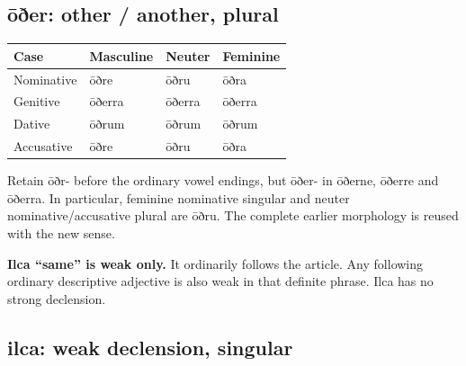 \subsection*{ōðer: other /\allowbreak{} another, plural}

\par\begingroup
\fontsize{10.5}{13.2}\selectfont
\setlength{\LTleft}{0pt}\setlength{\LTright}{\fill}
\noindent
\begin{tabular}{@{}>{\raggedright\arraybackslash}p{28.89mm}>{\raggedright\arraybackslash}p{28.89mm}>{\raggedright\arraybackslash}p{28.89mm}>{\raggedright\arraybackslash}p{28.89mm}@{}}
\toprule
\textbf{Case} & \textbf{Masculine} & \textbf{Neuter} & \textbf{Feminine} \\
\midrule
Nominative & ōðre & ōðru & ōðra \\
Genitive & ōðerra & ōðerra & ōðerra \\
Dative & ōðrum & ōðrum & ōðrum \\
Accusative & ōðre & ōðru & ōðra \\
\bottomrule
\end{tabular}
\par\endgroup

Retain ōðr- before the ordinary vowel endings, but ōðer- in ōðerne, ōðerre and ōðerra. In particular, feminine nominative singular and neuter nominative/\allowbreak{}accusative plural are ōðru. The complete earlier morphology is reused with the new sense.

\textbf{Ilca “same” is weak only.} It ordinarily follows the article. Any following ordinary descriptive adjective is also weak in that definite phrase. Ilca has no strong declension.

\subsection*{ilca: weak declension, singular}

